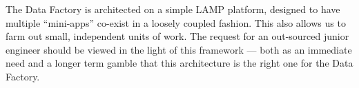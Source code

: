 \documentclass[letterpaper,12pt]{article}
\begin{document}
The Data Factory is architected on a simple LAMP platform, designed to
have multiple ``mini-apps'' co-exist in a loosely coupled fashion. This
also allows us to farm out small, independent units of work.  
The request for an out-sourced junior engineer should be viewed in the
light of this framework --- both as an immediate need and a longer term
gamble that this architecture is the right one for the Data Factory.

\begin{figure}
\end{figure}
\end{document}
